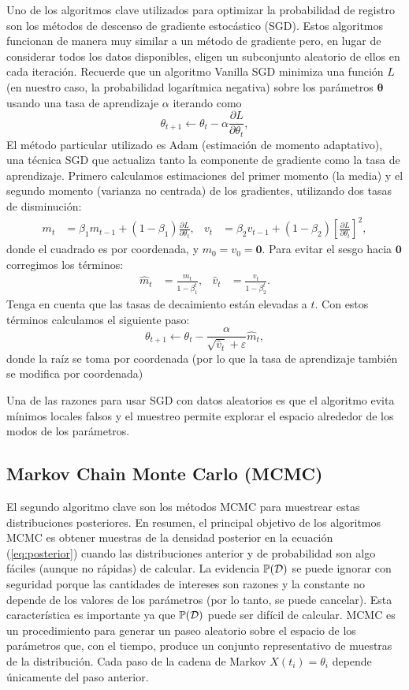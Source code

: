 Uno de los algoritmos clave utilizados para optimizar la probabilidad de registro son los métodos de descenso de gradiente estocástico (SGD). Estos algoritmos funcionan de manera muy similar a un método de  gradiente pero, en lugar de considerar todos los datos disponibles, eligen un subconjunto aleatorio de ellos en cada iteración. Recuerde que un algoritmo Vanilla SGD minimiza una función \(L\) (en nuestro caso, la probabilidad logarítmica negativa) sobre los parámetros \(\mathbf{\theta}\) usando una tasa de aprendizaje \(\alpha\) iterando como
\[ \theta_{t+1} \gets \theta_t - \alpha \frac{\partial L}{\partial \theta_t}, \]
El método particular utilizado es Adam (estimación de momento adaptativo), una técnica SGD que actualiza tanto la componente de gradiente como la tasa de aprendizaje. Primero calculamos estimaciones del primer momento (la media) y el segundo momento (varianza no centrada) de los gradientes, utilizando dos tasas de disminución:
\begin{align*}
m_t	&= \beta_1 m_{t-1} + (1-\beta_1) \frac{\partial L}{\partial \theta_t},	& v_t	&= \beta_2 v_{t-1} + (1-\beta_2) \left[\frac{\partial L}{\partial \theta_t}\right]^2,
\end{align*}
donde el cuadrado es por coordenada, y \(m_0 = v_0 = \mathbf{0}\). Para evitar el sesgo hacia \(\mathbf{0}\) corregimos los términos:
\begin{align*}
\hat{m}_t	&= \frac{m_t}{1 - \beta_1^t},	& \hat{v}_t	&= \frac{v_t}{1 - \beta_2^t}.
\end{align*}
Tenga en cuenta que las tasas de decaimiento están elevadas a \(t\). Con estos términos calculamos el siguiente paso:
\[ \theta_{t+1} \gets \theta_t - \frac{\alpha}{\sqrt{\hat{v}_t} + \varepsilon}\hat{m}_t, \]
donde la raíz se toma por coordenada (por lo que la tasa de aprendizaje también se modifica por coordenada)

Una de las razones para usar SGD con datos aleatorios es que el algoritmo evita mínimos locales falsos y el muestreo permite explorar el espacio alrededor de los modos de los parámetros.

\subsection{Markov Chain Monte Carlo (MCMC)}

El segundo algoritmo clave son los métodos MCMC para muestrear estas distribuciones posteriores. En resumen, el principal objetivo de los algoritmos MCMC es obtener muestras de la densidad posterior en la ecuación (\ref{eq:posterior}) cuando las distribuciones anterior y de probabilidad son algo fáciles (aunque no rápidas) de calcular. La evidencia \(\mathbb{P}(\mathcal{D})\) se puede ignorar con seguridad porque las cantidades de intereses son razones y la constante no depende de los valores de los parámetros (por lo tanto, se puede cancelar). Esta característica es importante ya que \(\mathbb{P}(\mathcal{D})\) puede ser difícil de calcular. MCMC es un procedimiento para generar un paseo aleatorio sobre el espacio de los parámetros que, con el tiempo, produce un conjunto representativo de muestras de la distribución. Cada paso de la cadena de Markov \( X(t_i) = \theta_i \) depende únicamente del paso anterior.

